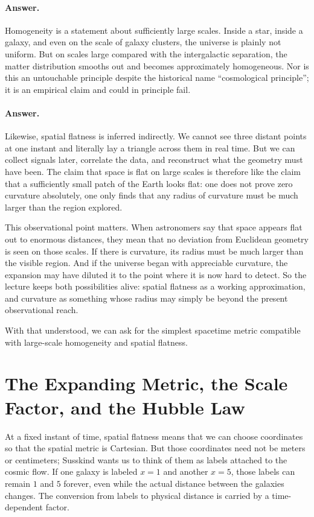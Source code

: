 \paragraph{Answer.} Homogeneity is a statement about sufficiently large scales. Inside a star, inside a galaxy, and even on the scale of galaxy clusters, the universe is plainly not uniform. But on scales large compared with the intergalactic separation, the matter distribution smooths out and becomes approximately homogeneous. Nor is this an untouchable principle despite the historical name ``cosmological principle''; it is an empirical claim and could in principle fail.

\paragraph{Answer.} Likewise, spatial flatness is inferred indirectly. We cannot see three distant points at one instant and literally lay a triangle across them in real time. But we can collect signals later, correlate the data, and reconstruct what the geometry must have been. The claim that space is flat on large scales is therefore like the claim that a sufficiently small patch of the Earth looks flat: one does not prove zero curvature absolutely, one only finds that any radius of curvature must be much larger than the region explored.

This observational point matters. When astronomers say that space appears flat out to enormous distances, they mean that no deviation from Euclidean geometry is seen on those scales. If there is curvature, its radius must be much larger than the visible region. And if the universe began with appreciable curvature, the expansion may have diluted it to the point where it is now hard to detect. So the lecture keeps both possibilities alive: spatial flatness as a working approximation, and curvature as something whose radius may simply be beyond the present observational reach.

With that understood, we can ask for the simplest spacetime metric compatible with large-scale homogeneity and spatial flatness.

\section{The Expanding Metric, the Scale Factor, and the Hubble Law}

At a fixed instant of time, spatial flatness means that we can choose coordinates so that the spatial metric is Cartesian. But those coordinates need not be meters or centimeters; Susskind wants us to think of them as labels attached to the cosmic flow. If one galaxy is labeled \(x=1\) and another \(x=5\), those labels can remain \(1\) and \(5\) forever, even while the actual distance between the galaxies changes. The conversion from labels to physical distance is carried by a time-dependent factor.

